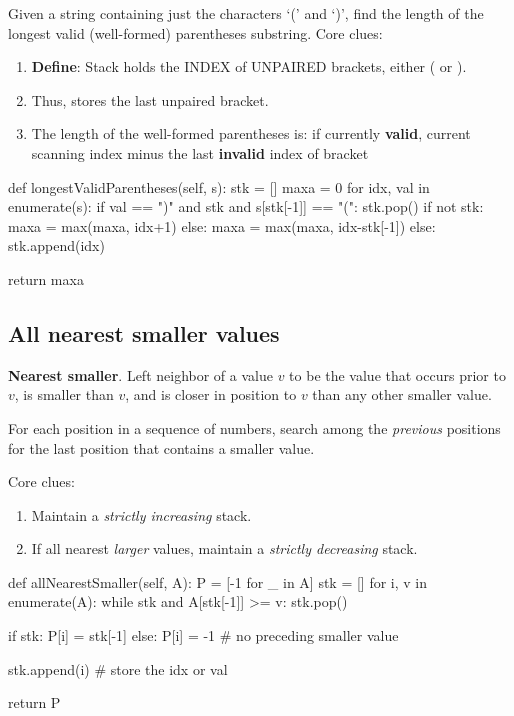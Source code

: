 Given a string containing just the characters `(' and `)', find the length of the longest valid (well-formed) parentheses substring. Core clues:
\begin{enumerate}
\item \textbf{Define}: Stack holds the INDEX of UNPAIRED brackets, either ( or ).
\item Thus,  stores the last unpaired bracket. 
\item The length of the well-formed parentheses is: if currently \textbf{valid}, current scanning index  minus the last \textbf{invalid} index of bracket 
\end{enumerate}
\begin{python}
def longestValidParentheses(self, s):
  stk = []
  maxa = 0
  for idx, val in enumerate(s):
    if val == ")" and stk and s[stk[-1]] == "(":
      stk.pop()
      if not stk:
        maxa = max(maxa, idx+1)
      else:
        maxa = max(maxa, idx-stk[-1])
    else:
      stk.append(idx)

  return maxa

\end{python}
\subsection{All nearest smaller values}\label{allNearestSmaller}
\textbf{Nearest smaller}. Left neighbor of a value $v$ to be the value that occurs prior to $v$, is smaller than $v$, and is closer in position to $v$ than any other smaller value.

For each position in a sequence of numbers, search among the \textit{previous} positions for the last position that contains a smaller value. 

Core clues:
\begin{enumerate}
\item Maintain a \textit{strictly increasing} stack.  
\item If all nearest \textit{larger} values, maintain a \textit{strictly decreasing} stack.  
\end{enumerate}

\begin{python}
def allNearestSmaller(self, A):
    P = [-1 for _ in A]
    stk = []
    for i, v in enumerate(A):
        while stk and A[stk[-1]] >= v: stk.pop()

        if stk:
            P[i] = stk[-1]
        else:
            P[i] = -1  # no preceding smaller value
            
        stk.append(i)  # store the idx or val

    return P
\end{python}

